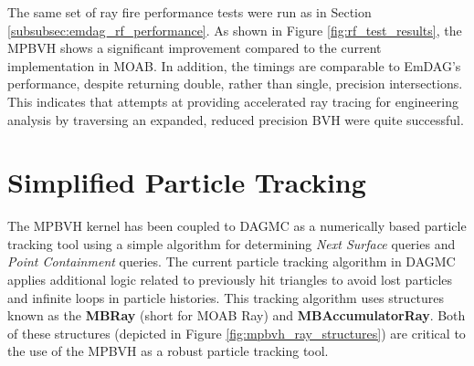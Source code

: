 The same set of ray fire performance tests were run as in Section
\ref{subsubsec:emdag_rf_performance}. As shown in Figure
\ref{fig:rf_test_results}, the MPBVH shows a significant improvement compared to
the current implementation in MOAB. In addition, the timings are comparable to
EmDAG's performance, despite returning double, rather than single, precision
intersections. This indicates that attempts at providing accelerated ray tracing
for engineering analysis by traversing an expanded, reduced precision BVH were
quite successful.

\section{Simplified Particle Tracking}\label{sec:simplified_particle_tracking}

The MPBVH kernel has been coupled to DAGMC as a numerically based particle
tracking tool using a simple algorithm for determining \textit{Next Surface}
queries and \textit{Point Containment} queries. The current particle tracking
algorithm in DAGMC \cite{Smith_2011} applies additional logic related to
previously hit triangles to avoid lost particles and infinite loops in particle
histories. This tracking algorithm uses structures known as the \textbf{MBRay}
(short for MOAB Ray) and \textbf{MBAccumulatorRay}. Both of these structures
(depicted in Figure \ref{fig:mpbvh_ray_structures}) are critical to the use of
the MPBVH as a robust particle tracking tool.

